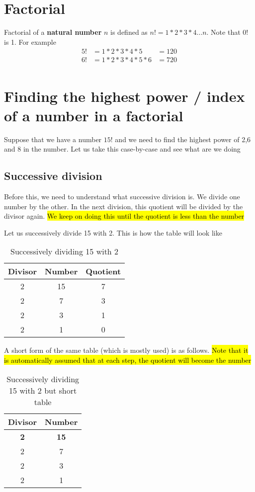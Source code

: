 \section{Factorial}
Factorial of a \textbf{natural number} $n$ is defined as $n! = 1 * 2 * 3 * 4 \ldots n$. Note that $0!$ is 1. For example
\begin{align*}
    5! &= 1 * 2 * 3 * 4 * 5 &= 120 \\
    6! &= 1 * 2 *3 * 4 * 5 * 6 &= 720 \\
\end{align*}

\section{Finding the highest power / index of a number in a factorial}

Suppose that we have a number $15!$ and we need to find the highest power of 2,6 and 8 in the number. Let us take this case-by-case and see what are we doing

\subsection{Successive division}
Before this, we need to understand what successive division is. We divide one number by the other. In the next division, this quotient will be divided by the divisor again. \hl{We keep on doing this until the quotient is less than the number}

Let us successively divide 15 with 2. This is how the table will look like

\begin{table}[ht!]
    \centering
    \begin{tabular}{|| c | c | c ||}
        \hline
        Divisor & Number & Quotient \\
        \hline
        2 & 15 & 7 \\
        2 & 7 & 3 \\
        2 & 3 & 1 \\
        2 & 1 & 0 \\
        \hline
    \end{tabular}
    \caption{Successively dividing 15 with 2}
\end{table}

A short form of the same table (which is mostly used) is as follows. \hl{Note that it is automatically assumed that at each step, the quotient will become the number}

\begin{table}[ht!]
    \centering
    \begin{tabular}{|| c | c ||}
        \hline
        Divisor & Number\\
        \hline
        \textbf{2} & \textbf{15}  \\
        2 & 7   \\
        2 & 3   \\
        2 & 1   \\
        \hline
    \end{tabular}
    \caption{Successively dividing 15 with 2 but short table}
    \label{tab:succ_div_15_2}
\end{table}

